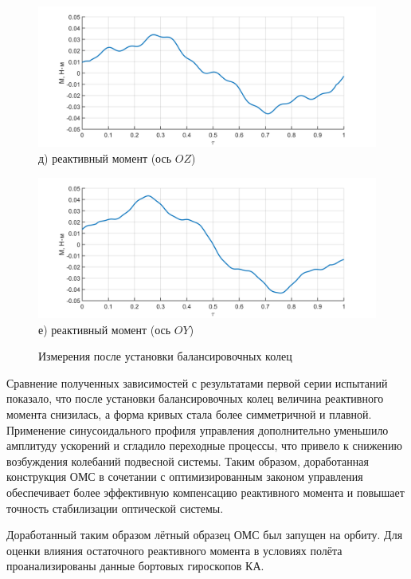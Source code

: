 \begin{figure}[h!]
	\begin{minipage}[b]{0.49\linewidth}\centering
		\includegraphics[width=\linewidth]{matlab/img/oz-gyro-sin-mom} \\ д) реактивный момент (ось $OZ$)
	\end{minipage}
	\hfill
	\begin{minipage}[b]{0.49\linewidth}\centering
		\includegraphics[width=\linewidth]{matlab/img/oy-gyro-sin-mom} \\ е)  реактивный момент (ось $OY$)
	\end{minipage}
	
	\caption{Измерения после установки балансировочных колец}
	\label{fig:sin-profile-omn}
\end{figure}

Сравнение полученных зависимостей с результатами первой серии испытаний показало, что после установки балансировочных колец величина реактивного момента снизилась, а форма кривых стала более симметричной и плавной. Применение синусоидального профиля управления дополнительно уменьшило амплитуду ускорений и сгладило переходные процессы, что привело к снижению возбуждения колебаний подвесной системы. Таким образом, доработанная конструкция ОМС в сочетании с оптимизированным законом управления обеспечивает более эффективную компенсацию реактивного момента и повышает точность стабилизации оптической системы.

Доработанный таким образом лётный образец ОМС был запущен на орбиту. Для оценки влияния остаточного реактивного момента в условиях полёта
проанализированы данные бортовых гироскопов КА.

